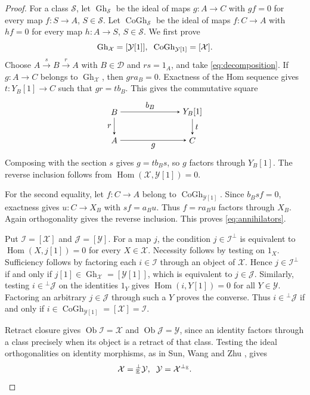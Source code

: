 \documentclass[11pt,a4paper,reqno]{amsart}
\newcommand{\Dcal}{\mathcal D}
\newcommand{\Ical}{\mathcal I}
\newcommand{\Scal}{\mathcal S}
\newcommand{\Xcal}{\mathcal X}
\newcommand{\Hom}{\operatorname{Hom}}
\theoremstyle{plain}
\theoremstyle{definition}
\theoremstyle{remark}
\newcommand{\Jcal}{\mathcal J}
\newcommand{\Ycal}{\mathcal Y}
\newcommand{\Ob}{\operatorname{Ob}}
\newcommand{\Gh}{\operatorname{Gh}}
\newcommand{\CoGh}{\operatorname{CoGh}}
\begin{document}
\begin{proof}
For a class $\Scal$, let $\Gh_{\Scal}$ be the ideal of maps $g:A\to C$ with $gf=0$ for every map $f:S\to A$, $S\in\Scal$. Let $\CoGh_{\Scal}$ be the ideal of maps $f:C\to A$ with $hf=0$ for every map $h:A\to S$, $S\in\Scal$. We first prove
\begin{equation}\label{eq:annihilators}
\Gh_{\Xcal}=[\Ycal[1]],
\hspace{2mm}
\CoGh_{\Ycal[1]}=[\Xcal].
\end{equation}
Choose $A\xrightarrow{s}B\xrightarrow{r}A$ with $B\in\Dcal$ and $rs=1_A$, and take \eqref{eq:decomposition}. If $g:A\to C$ belongs to $\Gh_{\Xcal}$, then $gr a_B=0$. Exactness of the Hom sequence gives $t:Y_B[1]\to C$ such that $gr=t b_B$. This gives the commutative square
$$
\begin{tikzpicture}[baseline=(current bounding box.center),>=stealth]
\node (B) at (0,1.2) {$B$};
\node (Y) at (3.3,1.2) {$Y_B[1]$};
\node (A) at (0,0) {$A$};
\node (C) at (3.3,0) {$C$};
\draw[->] (B) -- node[above] {$b_B$} (Y);
\draw[->] (B) -- node[left] {$r$} (A);
\draw[->] (Y) -- node[right] {$t$} (C);
\draw[->] (A) -- node[below] {$g$} (C);
\end{tikzpicture}
$$
Composing with the section $s$ gives $g=t b_Bs$, so $g$ factors through $Y_B[1]$. The reverse inclusion follows from $\Hom(\Xcal,\Ycal[1])=0$.

For the second equality, let $f:C\to A$ belong to $\CoGh_{\Ycal[1]}$. Since $b_Bsf=0$, exactness gives $u:C\to X_B$ with $sf=a_Bu$. Thus $f=r a_Bu$ factors through $X_B$. Again orthogonality gives the reverse inclusion. This proves \eqref{eq:annihilators}.

Put $\Ical=[\Xcal]$ and $\Jcal=[\Ycal]$. For a map $j$, the condition $j\in\Ical^\perp$ is equivalent to $\Hom(X,j[1])=0$ for every $X\in\Xcal$. Necessity follows by testing on $1_X$. Sufficiency follows by factoring each $i\in\Ical$ through an object of $\Xcal$. Hence $j\in\Ical^\perp$ if and only if $j[1]\in\Gh_{\Xcal}=[\Ycal[1]]$, which is equivalent to $j\in\Jcal$. Similarly, testing $i\in{}^\perp\Jcal$ on the identities $1_Y$ gives $\Hom(i,Y[1])=0$ for all $Y\in\Ycal$. Factoring an arbitrary $j\in\Jcal$ through such a $Y$ proves the converse. Thus $i\in{}^\perp\Jcal$ if and only if $i\in\CoGh_{\Ycal[1]}=[\Xcal]=\Ical$.

Retract closure gives $\Ob\Ical=\Xcal$ and $\Ob\Jcal=\Ycal$, since an identity factors through a class precisely when its object is a retract of that class. Testing the ideal orthogonalities on identity morphisms, as in Sun, Wang and Zhu \cite[Lemma~3.5]{SWZ24}, gives
$$
\Xcal={}^\perp_{\mathbb E}\Ycal,
\hspace{2mm}
\Ycal=\Xcal^{\perp_{\mathbb E}}.
$$


\end{proof}
\end{document}
